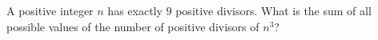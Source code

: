A positive integer $n$ has exactly $9$ positive divisors. What is the sum of all possible values of the number of positive divisors of $n^3$?
